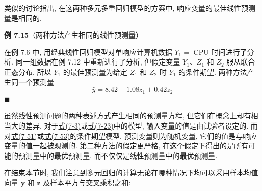 类似的讨论指出, 在这两种多元多重回归模型的方案中, 响应变量的最佳线性预测量是相同的.

\noindent\textbf{例 7.15}\quad （两种方法产生相同的线性预测量）

在例 7.6 中, 用经典线性回归模型对单响应计算机数据 $Y_1=$ CPU 时间进行了分析. 同一组数据在例 7.12 中重新进行了分析, 但假定变量 $Y_1$、$Z_1$ 和 $Z_2$ 服从联合正态分布, 所以 $Y_1$ 的最佳预测量为给定 $Z_1$ 和 $Z_2$ 时 $Y_1$ 的条件期望. 两种方法产生同一个预测量
\[
\hat{y}=8.42+1.08z_1+0.42z_2
\]
\hfill$\blacksquare$

虽然线性预测问题的两种表述方式产生相同的预测量方程, 但它们在概念上却有相当大的差异. 对于\hyperref[eq:7-3]{式(7-3)}或\hyperref[eq:7-23]{式(7-23)}中的模型, 输入变量的值是由试验者设定的. 而对\hyperref[eq:7-51]{式(7-51)}或\hyperref[eq:7-53]{式(7-53)}的条件期望模型, 预测变量则为随机变量, 它们的值是与响应变量的值一起被观测的. 第二种方法的假定更严格, 在这个假定下得出的是所有可能的预测量中的最优预测量, 而不仅仅是线性预测量中的最优预测量.

在结束本节时, 我们注意到多元回归的计算无论在哪种情况下均可以采用样本均值向量 $\bar{\mathbf{y}}$ 和 $\bar{\mathbf{z}}$ 及样本平方与交叉乘积之和:
